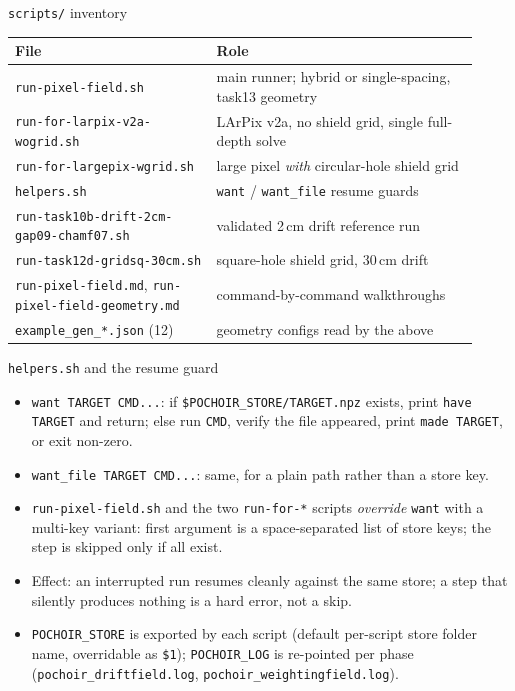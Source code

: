 \documentclass[10pt,aspectratio=169]{beamer}
\newcommand{\ti}[1]{\texttt{\footnotesize #1}}
\begin{document}
\begin{frame}[allowframebreaks]{\texttt{scripts/} inventory}
  \small
  \begin{center}
  \begin{tabular}{p{0.40\linewidth}p{0.52\linewidth}}
    \toprule
    File & Role \\
    \midrule
    \ti{run-pixel-field.sh} & main runner; hybrid or single-spacing, task13 geometry \\
    \ti{run-for-larpix-v2a-wogrid.sh} & LArPix v2a, no shield grid, single full-depth solve \\
    \ti{run-for-largepix-wgrid.sh} & large pixel \emph{with} circular-hole shield grid \\
    \ti{helpers.sh} & \ti{want} / \ti{want\_file} resume guards \\
    \ti{run-task10b-drift-2cm-gap09-chamf07.sh} & validated 2\,cm drift reference run \\
    \ti{run-task12d-gridsq-30cm.sh} & square-hole shield grid, 30\,cm drift \\
    \ti{run-pixel-field.md}, \ti{run-pixel-field-geometry.md} & command-by-command walkthroughs \\
    \ti{example\_gen\_*.json} (12) & geometry configs read by the above \\
    \bottomrule
  \end{tabular}
  \end{center}
\end{frame}

\begin{frame}{\texttt{helpers.sh} and the resume guard}
  \begin{itemize}\small
  \item \ti{want TARGET CMD...}: if \ti{\$POCHOIR\_STORE/TARGET.npz} exists, print
        \ti{have TARGET} and return; else run \ti{CMD}, verify the file appeared, print
        \ti{made TARGET}, or exit non-zero.
  \item \ti{want\_file TARGET CMD...}: same, for a plain path rather than a store key.
  \item \ti{run-pixel-field.sh} and the two \ti{run-for-*} scripts \emph{override}
        \ti{want} with a multi-key variant: first argument is a space-separated list of
        store keys; the step is skipped only if all exist.
  \item Effect: an interrupted run resumes cleanly against the same store; a step that
        silently produces nothing is a hard error, not a skip.
  \item \ti{POCHOIR\_STORE} is exported by each script (default per-script store folder
        name, overridable as \ti{\$1}); \ti{POCHOIR\_LOG} is re-pointed per phase
        (\ti{pochoir\_driftfield.log}, \ti{pochoir\_weightingfield.log}).
  \end{itemize}
\end{frame}
\end{document}
